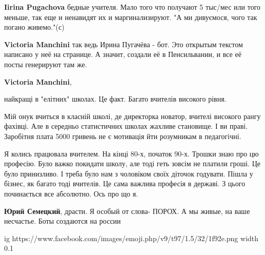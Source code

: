 \begin{itemize}
\begin{itemize}

\textbf{Iirina Pugachova} бедные учителя. Мало того что получают 5 тыс/мес или того меньше, так еще и ненавидят их и маргинализируют.
"А ми дивуємося, чого так погано живемо."(с)


\textbf{Victoria Manchini} так ведь Ирина Пугачёва - бот. Это открытым текстом написано у неё на странице. А значит, создали её в Пенсильвании, и все её посты генерируют там же.


\textbf{Victoria Manchini}, 

найкращі в "елітних" школах. Це факт. Багато вчителів високого рівня.

Мій онук вчиться в класній школі, де директорка новатор, вчителі високого рангу
фахівці. Але в середньо статистичних школах жахливе становище.
І ви праві. Заробітня плата 5000 гривень не є мотивація йти
розумникам в педагогічні.

\obeycr
Я колись працювала вчителем. На кінці 80-х, початок 90-х.
Трошки знаю про цю професію.
Було важко покидати школу, але тоді геть зовсім не платили гроші.
Це було принизливо.
І треба було нам з чоловіком своїх діточок годувати.
Пішла у бізнес, як багато тоді вчителів.
Це сама важлива професія в державі.
З цього починається все абсолютно.
Ось про що я.
\restorecr


\textbf{Юрий Семецкий}, драсти. Я особый от слова- ПОРОХ.
А мы живые, на ваше несчастье.
Боты создаются на россии
\end{itemize}


\ifcmt
  ig https://www.facebook.com/images/emoji.php/v9/t97/1.5/32/1f92e.png
  width 0.1
\fi



\end{itemize}
